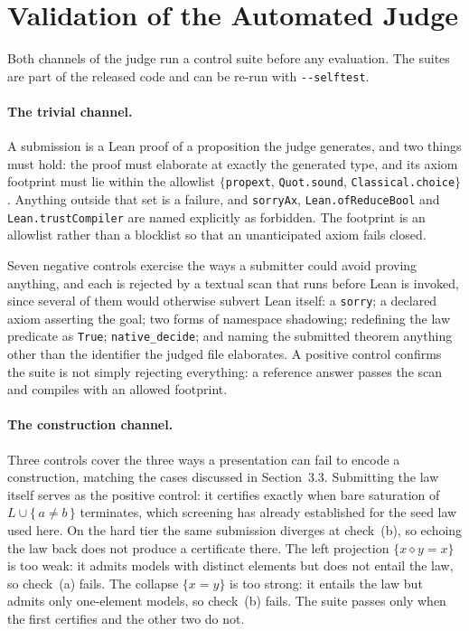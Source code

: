 \documentclass[letterpaper]{article}
\newcommand{\op}{\diamond}
\begin{document}
\section{Validation of the Automated Judge}
\label{app:judge}

Both channels of the judge run a control suite before any evaluation. The
suites are part of the released code and can be re-run with
\texttt{-{}-selftest}.

\paragraph{The trivial channel.} A submission is a Lean proof of a proposition
the judge generates, and two things must hold: the proof must elaborate at
exactly the generated type, and its axiom footprint must lie within the
allowlist $\{$\texttt{propext}, \texttt{Quot.sound},
\texttt{Classical.choice}$\}$. Anything outside that set is a failure, and
\texttt{sorryAx}, \texttt{Lean.ofReduceBool} and \texttt{Lean.trustCompiler}
are named explicitly as forbidden. The footprint is an allowlist rather than a
blocklist so that an unanticipated axiom fails closed.

Seven negative controls exercise the ways a submitter could avoid proving
anything, and each is rejected by a textual scan that runs before Lean is
invoked, since several of them would otherwise subvert Lean itself: a
\texttt{sorry}; a declared axiom asserting the goal; two forms of namespace
shadowing; redefining the law predicate as \texttt{True}; \texttt{native\_decide};
and naming the submitted theorem anything other than the identifier the judged
file elaborates. A positive control confirms the suite is not simply rejecting
everything: a reference answer passes the scan and compiles with an allowed
footprint.

\paragraph{The construction channel.} Three controls cover the three ways a
presentation can fail to encode a construction, matching the cases discussed in
Section~3.3. Submitting the law itself serves as the positive control: it
certifies exactly when bare saturation of $L \cup \{\,a \neq b\,\}$
terminates, which screening has already established for the seed law used
here. On the hard tier the same submission diverges at check~(b), so echoing
the law back does not produce a certificate there. The left projection $\{x \op y = x\}$ is too weak: it admits models
with distinct elements but does not entail the law, so check~(a) fails. The
collapse $\{x = y\}$ is too strong: it entails the law but admits only
one-element models, so check~(b) fails. The suite passes only when the first
certifies and the other two do not.
\end{document}
